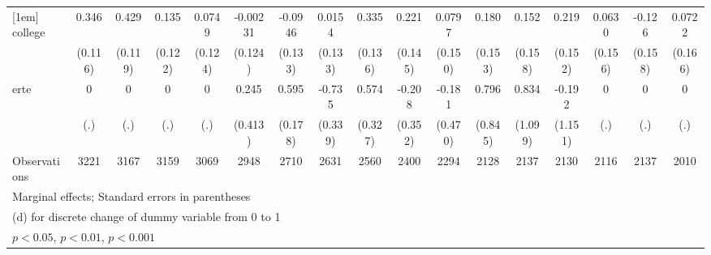 {\begin{tabular}{l*{16}{c}}
[1em]
college             &       0.346\sym{**} &       0.429\sym{***}&       0.135         &      0.0749         &    -0.00231         &     -0.0946         &      0.0154         &       0.335\sym{*}  &       0.221         &      0.0797         &       0.180         &       0.152         &       0.219         &      0.0630         &      -0.126         &      0.0722         \\
                    &     (0.116)         &     (0.119)         &     (0.122)         &     (0.124)         &     (0.124)         &     (0.133)         &     (0.133)         &     (0.136)         &     (0.145)         &     (0.150)         &     (0.153)         &     (0.158)         &     (0.152)         &     (0.156)         &     (0.158)         &     (0.166)         \\
[1em]
erte                &           0         &           0         &           0         &           0         &       0.245         &       0.595\sym{***}&      -0.735\sym{*}  &       0.574         &      -0.208         &      -0.181         &       0.796         &       0.834         &      -0.192         &           0         &           0         &           0         \\
                    &         (.)         &         (.)         &         (.)         &         (.)         &     (0.413)         &     (0.178)         &     (0.339)         &     (0.327)         &     (0.352)         &     (0.470)         &     (0.845)         &     (1.099)         &     (1.151)         &         (.)         &         (.)         &         (.)         \\
\hline
Observations        &        3221         &        3167         &        3159         &        3069         &        2948         &        2710         &        2631         &        2560         &        2400         &        2294         &        2128         &        2137         &        2130         &        2116         &        2137         &        2010         \\
\hline\hline
\multicolumn{17}{l}{\footnotesize Marginal effects; Standard errors in parentheses}\\
\multicolumn{17}{l}{\footnotesize  (d) for discrete change of dummy variable from 0 to 1}\\
\multicolumn{17}{l}{\footnotesize \sym{*} \(p<0.05\), \sym{**} \(p<0.01\), \sym{***} \(p<0.001\)}\\
\end{tabular}
}
